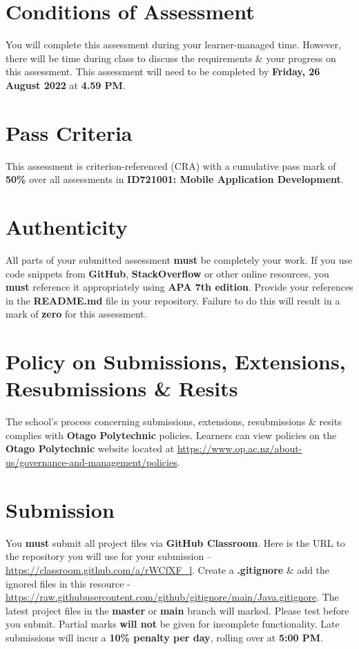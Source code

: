 \documentclass{article}
\begin{document}
\section*{Conditions of Assessment}
You will complete this assessment during your learner-managed time. However, there will be time during class to discuss the requirements \& your progress on this assessment. This assessment will need to be completed by \textbf{Friday, 26 August 2022} at \textbf{4.59 PM}.

\section*{Pass Criteria}
This assessment is criterion-referenced (CRA) with a cumulative pass mark of \textbf{50\%} over all assessments in \textbf{ID721001: Mobile Application Development}.

\section*{Authenticity}
All parts of your submitted assessment \textbf{must} be completely your work. If you use code snippets from \textbf{GitHub}, \textbf{StackOverflow} or other online resources, you \textbf{must} reference it appropriately using \textbf{APA 7th edition}. Provide your references in the \textbf{README.md} file in your repository. Failure to do this will result in a mark of \textbf{zero} for this assessment.

\section*{Policy on Submissions, Extensions, Resubmissions \& Resits}
The school's process concerning submissions, extensions, resubmissions \& resits complies with \textbf{Otago Polytechnic} policies. Learners can view policies on the \textbf{Otago Polytechnic} website located at \href{https://www.op.ac.nz/about-us/governance-and-management/policies}{https://www.op.ac.nz/about-us/governance-and-management/policies}.

\section*{Submission}
You \textbf{must} submit all project files via \textbf{GitHub Classroom}. Here is the URL to the repository you will use for your submission – \href{https://classroom.github.com/a/rWCfXF\_l}{https://classroom.github.com/a/rWCfXF\_l}.  Create a \textbf{.gitignore} \& add the ignored files in this resource - \href{https://raw.githubusercontent.com/github/gitignore/main/Java.gitignore}{https://raw.githubusercontent.com/github/gitignore/main/Java.gitignore}. The latest project files in the \textbf{master} or \textbf{main} branch will marked. Please test before you submit. Partial marks \textbf{will not} be given for incomplete functionality. Late submissions will incur a \textbf{10\% penalty per day}, rolling over at \textbf{5:00 PM}.
\end{document}
